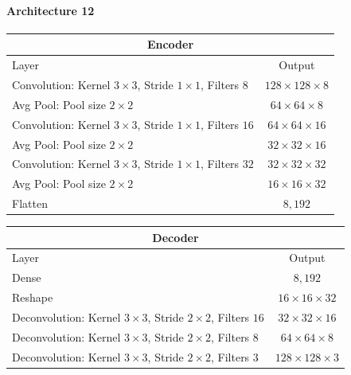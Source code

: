\paragraph{Architecture 12}

\begin{center}
    \begin{table}[H]
        \centering
        \begin{tabular}{ | l | c | }
            \multicolumn{2}{c}{Encoder} \\ \hline
            Layer & Output\\ \hline
            Convolution: Kernel $3\times3$, Stride $1\times1$, Filters $8  $    & $128\times 128\times 8  $    \\
            Avg Pool: Pool size $2\times2$                                      & $64\times 64\times   8  $    \\  
            Convolution: Kernel $3\times3$, Stride $1\times1$, Filters $16 $    & $64\times 64\times   16 $    \\
            Avg Pool: Pool size $2\times2$                                      & $32\times 32\times   16 $    \\
            Convolution: Kernel $3\times3$, Stride $1\times1$, Filters $32 $    & $32\times 32\times   32 $    \\
            Avg Pool: Pool size $2\times2$                                      & $16\times 16\times   32 $    \\
            Flatten                                                             & $8,192$                      \\
            \hline
        \end{tabular} 
    \end{table}
\end{center}
\vspace{-4em}
\begin{center}
    \begin{table}[H]
        \centering
        \begin{tabular}{ | l | c | }
            \multicolumn{2}{c}{Decoder} \\ \hline
            Layer & Output\\ \hline
            Dense                                                                   & $8,192$                   \\
            Reshape                                                                 & $16\times 16\times  32 $  \\
            Deconvolution: Kernel $3\times3$, Stride $2\times2$, Filters $16 $      & $32\times 32\times  16 $  \\
            Deconvolution: Kernel $3\times3$, Stride $2\times2$, Filters $8  $      & $64\times 64\times  8  $  \\
            Deconvolution: Kernel $3\times3$, Stride $2\times2$, Filters $3  $      & $128\times 128\times3  $  \\
            \hline
        \end{tabular} 
    \end{table}
\end{center}

